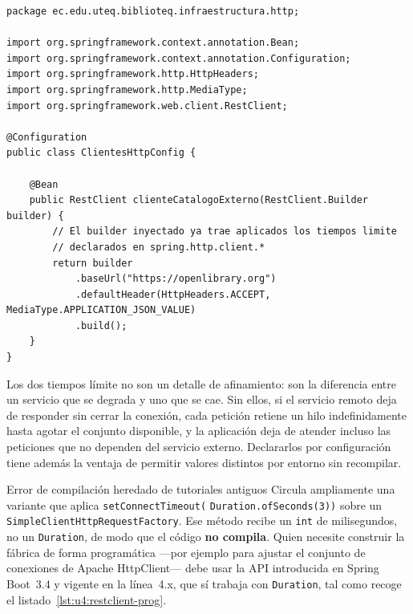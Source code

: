\documentclass[11pt,a4paper,openany]{book}
\begin{document}
\begin{lstlisting}[style=java,caption={Cliente HTTP declarado como bean sobre los tiempos limite globales.},label={lst:u4:restclient}]
package ec.edu.uteq.biblioteq.infraestructura.http;

import org.springframework.context.annotation.Bean;
import org.springframework.context.annotation.Configuration;
import org.springframework.http.HttpHeaders;
import org.springframework.http.MediaType;
import org.springframework.web.client.RestClient;

@Configuration
public class ClientesHttpConfig {

	@Bean
	public RestClient clienteCatalogoExterno(RestClient.Builder builder) {
		// El builder inyectado ya trae aplicados los tiempos limite
		// declarados en spring.http.client.*
		return builder
			.baseUrl("https://openlibrary.org")
			.defaultHeader(HttpHeaders.ACCEPT, MediaType.APPLICATION_JSON_VALUE)
			.build();
	}
}
\end{lstlisting}

Los dos tiempos límite no son un detalle de afinamiento: son la diferencia entre un servicio que se degrada y uno que se cae. Sin ellos, si el servicio remoto deja de responder sin cerrar la conexión, cada petición retiene un hilo indefinidamente hasta agotar el conjunto disponible, y la aplicación deja de atender incluso las peticiones que no dependen del servicio externo. Declararlos por configuración tiene además la ventaja de permitir valores distintos por entorno sin recompilar.

\begin{cajaadvertencia}{Error de compilación heredado de tutoriales antiguos}
	Circula ampliamente una variante que aplica \texttt{setConnectTimeout(} \texttt{Duration.ofSeconds(3))} sobre un \texttt{SimpleClientHttpRequestFactory}. Ese método recibe un \texttt{int} de milisegundos, no un \texttt{Duration}, de modo que el código \textbf{no compila}. Quien necesite construir la fábrica de forma programática ---por ejemplo para ajustar el conjunto de conexiones de Apache HttpClient--- debe usar la API introducida en Spring Boot~3.4 y vigente en la línea~4.x, que sí trabaja con \texttt{Duration}, tal como recoge el listado~\ref{lst:u4:restclient-prog}.
\end{cajaadvertencia}
\end{document}
